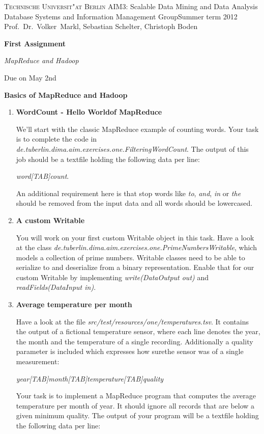 \documentclass[11pt,a4paper]{article}
\begin{document}
\textsc{Technische Universit"at Berlin}{\small\hfill 
AIM3: Scalable Data Mining and Data Analysis}\\
{\small Database Systems and Information Management Group{\small\hfill Summer term 2012}\\
Prof.~Dr.~Volker~Markl, Sebastian Schelter, Christoph Boden}

\bigskip
\centerline{\Large\textbf{First Assignment}}
\centerline{\emph{MapReduce and Hadoop}}
\centerline{Due on May 2nd}
\bigskip

\centerline{\textbf{Basics of MapReduce and Hadoop}}
\bigskip

\begin{enumerate}
\item \textbf{WordCount - \dq{}Hello World\dq of MapReduce}

We'll start with the classic MapReduce example of counting words. Your task is to complete the code in \textit{de.tuberlin.dima.aim.exercises.one.FilteringWordCount}.
The output of this job should be a textfile holding the following data per line:

\textit{word[TAB]count}.

An additional requirement here is that stop words like \textit{to}, \textit{and}, \textit{in} or \textit{the} should be removed from the input data and all words should be lowercased.

\item \textbf{A custom Writable}

You will work on your first custom Writable object in this task. Have a look at the class \textit{de.tuberlin.dima.aim.exercises.one.PrimeNumbersWritable}, which models a collection of prime numbers. Writable classes need to be able to serialize to and deserialize from a binary representation.
Enable that for our custom Writable by implementing \textit{write(DataOutput out)} and \textit{readFields(DataInput in)}.

\item \textbf{Average temperature per month}

Have a look at the file \textit{src/test/resources/one/temperatures.tsv}. It contains the output of a fictional temperature sensor, where each line denotes the year, the month and the temperature of a single recording. Additionally a quality parameter is included which expresses how \dq{}sure\dq the sensor was of a single measurement:

\textit{year[TAB]month[TAB]temperature[TAB]quality}

Your task is to implement a MapReduce program that computes the average temperature per month of year. It should ignore all records that are below a given minimum quality. The output of your program will be a textfile holding the following data per line: 


\end{enumerate}
\end{document}
